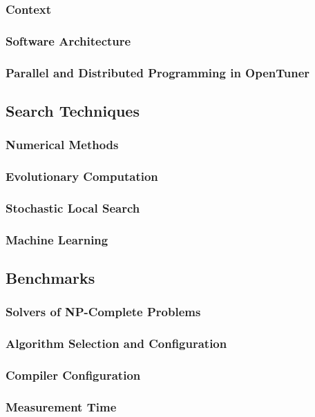 \subsubsection{Context}
\label{sec:context}

\subsubsection{Software Architecture}
\label{sec:arch}

\subsubsection{Parallel and Distributed Programming in OpenTuner}
\label{sec:opentuner-parallel}

\subsection{Search Techniques}
\label{sec:techniques}

\subsubsection{Numerical Methods}
\label{subsec:num}

\subsubsection{Evolutionary Computation}
\label{subsec:tuninevolcomp}

\subsubsection{Stochastic Local Search}
\label{subsec:tuningsls}

\subsubsection{Machine Learning}
\label{subsec:tuningml}

\subsection{Benchmarks}
\label{sec:benchmarks}

\subsubsection{Solvers of NP-Complete Problems}
\label{subsec:np}

\subsubsection{Algorithm Selection and Configuration}
\label{subsec:algsel}

\subsubsection{Compiler Configuration}
\label{subsec:compilerconfig}

\subsubsection{Measurement Time}
\label{subsec:measure}
